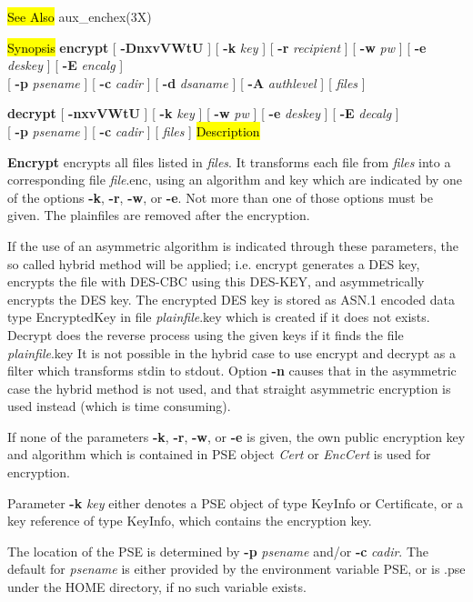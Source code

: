 \hl{See Also}
aux\_enchex(3X)

\label{encrypt}
\hl{Synopsis}
{\bf encrypt} [ {\bf -DnxvVWtU} ] [ {\bf -k} {\em key} ] [ {\bf -r} {\em recipient} ] [ {\bf -w} {\em pw} ] [ {\bf -e} {\em deskey} ] [ {\bf 
-E} {\em encalg} ] 
\\ \hspace*{1.59cm} [ {\bf -p} {\em psename} ] [ {\bf -c} {\em cadir} ] [ {\bf -d} {\em dsaname} ] [ {\bf -A} {\em authlevel} ] [ {\em files} ]

{\bf decrypt} [ {\bf -nxvVWtU} ] [ {\bf -k} {\em key} ] [ {\bf -w} {\em pw} ] [ {\bf -e} {\em deskey} ] [ {\bf -E} {\em decalg} ] \\
\hspace*{1.59cm} [ {\bf -p} {\em psename} ] [ {\bf -c} {\em cadir} ] [ {\em files} ]
\hl{Description}

{\large\bf Encrypt} encrypts all files listed in {\em files}. It transforms each
file from {\em files} into a corresponding file {\em file}.enc, using 
an algorithm and key which are indicated by one of the options 
{\bf -k}, {\bf -r}, {\bf -w}, or {\bf -e}. Not more than one of those options 
must be given.
The plainfiles are removed after the encryption.

If the use of an asymmetric algorithm is indicated through
these parameters, the so called hybrid method will be applied; i.e. encrypt
generates a DES key, encrypts the file with DES-CBC using this DES-KEY,
and asymmetrically encrypts the DES key. The encrypted DES key is stored as
ASN.1 encoded data type EncryptedKey
in file {\em plainfile}.key which is created if it does not exists. Decrypt
does the reverse process using the given keys if it finds the file {\em plainfile}.key
It is not possible in the hybrid case to use encrypt and decrypt as a filter
which transforms stdin to stdout. Option {\bf -n} causes that in the asymmetric case
the hybrid method is not used, and that straight asymmetric encryption is
used instead (which is time consuming).
 
If none of the parameters {\bf -k}, {\bf -r}, {\bf -w}, or {\bf -e} is given, the own public
encryption key and algorithm which is contained in PSE object {\em Cert} or {\em EncCert} is used
for encryption. 
 
Parameter {\bf -k} {\em key} either denotes a PSE object of type KeyInfo or Certificate, 
or a key reference of type KeyInfo, which contains the encryption key.

The location of the PSE is determined by {\bf -p} {\em psename} and/or {\bf -c} {\em cadir}. 
The default for {\em 
psename} is either provided by the environment variable PSE, or is .pse under the HOME directory, 
if no such variable exists.
 
